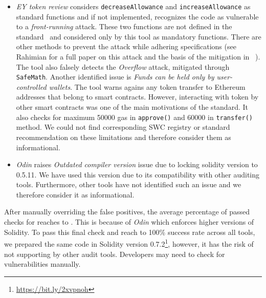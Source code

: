\begin{itemize}
	\item \textit{EY token review} considers \texttt{decreaseAllowance} and \texttt{increaseAllowance} as standard \erc functions and if not implemented, recognizes the code as vulnerable to a \textit{front-running} attack. These two functions are not defined in the \erc standard~\cite{ERC20Std} and considered only by this tool as mandatory functions. There are other methods to prevent the attack while adhering \erc specifications (see Rahimian \etal for a full paper on this attack and the basis of the mitigation in \sys~\cite{ERC20MWA}). The tool also falsely detects the \textit{Overflow} attack, mitigated through \texttt{SafeMath}. Another identified issue is \textit{Funds can be held only by user-controlled wallets}. The tool warns agains any token transfer to Ethereum addresses that belong to smart contracts. However, interacting with \erc token by other smart contracts was one of the main motivations of the \erc standard. It also checks for maximum 50000 gas in \texttt{approve()} and 60000 in \texttt{transfer()} method. We could not find corresponding SWC registry or standard recommendation on these limitations {\chg and therefore consider them as informational.}

	\item \textit{Odin} raises \textit{Outdated compiler version} issue due to locking solidity version to 0.5.11. We have used this version due to its compatibility with other auditing tools. Furthermore, other tools have not identified such an issue {\chg and we therefore consider it as informational}.
\end{itemize}

After manually overriding the false positives, the average percentage of passed checks for \sys reaches to \prct. {\chg This is because of \textit{Odin} which enforces higher versions of Solidity. To pass this final check and reach to 100\% success rate across all tools, we prepared the same code in Solidity version 0.7.2\footnote{\url{https://bit.ly/2xvpnoh}}, however, it has the risk of not supporting by other audit tools. Developers may need to check for vulnerabilities manually.}
